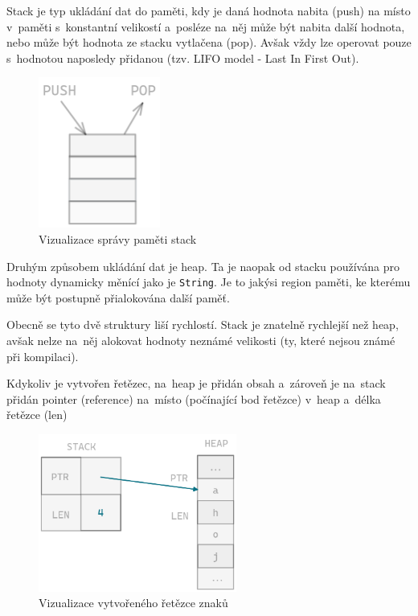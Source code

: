 \documentclass[a4paper, 12pt, twoside]{article} %
\begin{document}
				Stack je typ ukládání dat do paměti, kdy je daná hodnota nabita (push) na místo v~paměti s~konstantní velikostí a~posléze na~něj může být nabita další hodnota, nebo může být hodnota ze stacku vytlačena (pop). Avšak vždy lze operovat pouze s~hodnotou naposledy přidanou (tzv. LIFO model - Last In First Out).
				\begin{center}
					\begin{figure}[H]
						\centering
						\includegraphics[width=4cm]{stack}
						\caption{Vizualizace správy paměti stack}
						\label{fig:my_label_2}
					\end{figure}
				\end{center}
	
				Druhým způsobem ukládání dat je heap. Ta je naopak od stacku používána pro hodnoty dynamicky měnící jako je \texttt{String}. Je to jakýsi region paměti, ke kterému může být postupně přialokována další paměť.
					
				Obecně se tyto dvě struktury liší rychlostí. Stack je znatelně rychlejší než heap, avšak nelze na~něj alokovat hodnoty neznámé velikosti (ty, které nejsou známé při kompilaci).
	
				Kdykoliv je vytvořen řetězec, na~heap je přidán obsah a~zároveň je na~stack přidán pointer (reference) na~místo (počínající bod řetězce) v~heap a~délka řetězce (len)
					
				\begin{center}
					\begin{figure}[H]
						\centering
						\includegraphics[width=6.5cm]{string_heap}
						\caption{Vizualizace vytvořeného řetězce znaků}
						\label{fig:my_label_3}
					\end{figure}
				\end{center}
					
\end{document}
